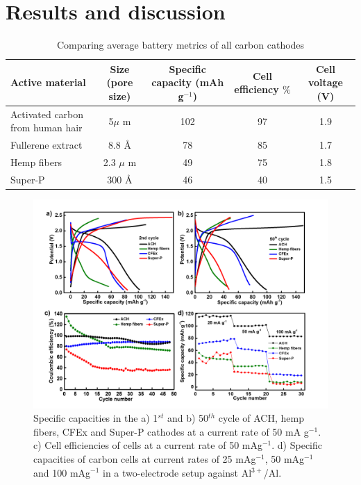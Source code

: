 \section{Results and discussion}
\begin{table}[t]
\caption{Comparing average battery metrics of all carbon cathodes} \label{table1}
\begin{center}
\begin{tabular}{|lcccc|}
\hline
Active material & {\textbf{Size (pore size)}} & {\textbf{Specific capacity (mAh g$^{-1}$)}} & {\textbf{Cell efficiency $\%$}} & {\textbf{Cell voltage (V)}}\\
\hline
Activated carbon from human hair & 5${\mu}$ m & 102 & 97 & 1.9 \\
Fullerene extract & 8.8 \AA & 78 & 85 & 1.7 \\
Hemp fibers & 2.3 $\mu$ m & 49 & 75 & 1.8 \\
Super-P & 300 \AA & 46 & 40 & 1.5 \\
\hline  %
\end{tabular}
\end{center}
\end{table}
\begin{figure}[tbh!]
  \centering
  \includegraphics[width=\textwidth]{Figures/chap5fig/cdcall}
    \caption{Specific capacities in the a) 1$^{st}$ and b) 50$^{th}$ cycle of ACH, hemp fibers, CFEx and Super-P cathodes at a current rate of 50 mA g$^{-1}$. c) Cell efficiencies of cells at a current rate of 50 mAg$^{-1}$. d) Specific capacities of carbon cells at current rates of 25 mAg$^{-1}$, 50 mAg$^{-1}$ and 100 mAg$^{-1}$ in a two-electrode setup against Al$^{3+}$/Al. }
  \label{Figures/chap5fig:cdcall}
\end{figure}
